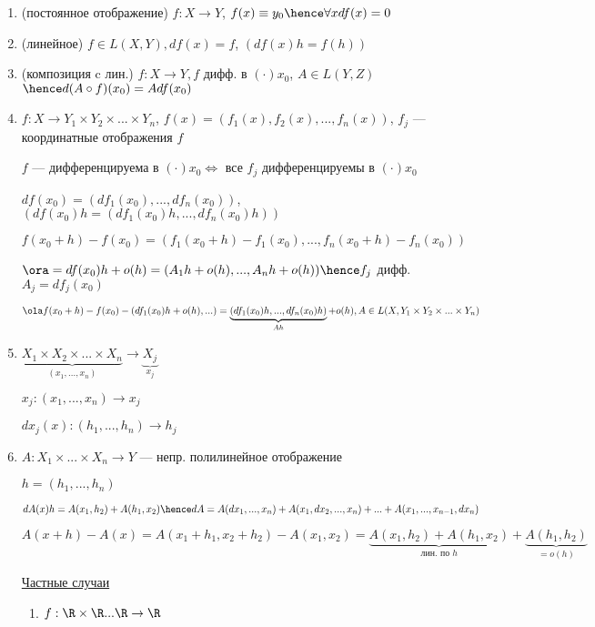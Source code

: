 \begin{examples}
\begin{enumerate}
    \item (постоянное отображение) $f: X \to Y$, $f(x) \equiv y_0 \hence \forall x df(x) = 0$
    \item (линейное) $f \in L(X, Y), df(x) = f$, $(df(x)h = f(h))$
    \item (композиция c лин.) $f : X \to Y, f$ дифф. в $(\cdot) x_0$, $A \in L(Y, Z)$ 
        $ \hence d(A \circ f)(x_0) = Adf(x_0)$
    \item $f : X \to Y_1 \times Y_2 \times ... \times Y_n$, $f(x) = (f_1(x), f_2(x), ..., f_n(x))$, $f_j$ --- координатные отображения $f$
    
    $f$ --- дифференцируема в $(\cdot) x_0 \Longleftrightarrow $ все $f_j $ дифференцируемы в $(\cdot) x_0$

    $df(x_0) = (df_1(x_0), ..., df_n(x_0))$, $\left( df(x_0)h = (df_1(x_0)h, ..., df_n(x_0)h) \right)$

    $f(x_0 + h) - f(x_0) = (f_1(x_0 + h) - f_1(x_0), ... , f_n(x_0 + h) - f_n(x_0))$

    $\ora = df(x_0)h + o(h) = (A_1h + o(h), ... , A_nh + o(h)) \hence f_j$ дифф. $A_j = df_j(x_0)$

    $\ola f(x_0 + h) - f(x_0) - (df_1(x_0)h + o(h), ... ) = \underbrace{(df_1(x_0) h, ... , df_n(x_0) h)}_{Ah} + o(h), A \in L(X, Y_1 \times Y_2 \times ... \times Y_n)$


    \item $\underbrace{X_1 \times X_2 \times ... \times X_n }_{(x_1, ... , x_n)}\to \underbrace{X_j}_{x_j}$
    
    $x_j : (x_1, ..., x_n) \to x_j$

    $dx_j(x) : (h_1, ..., h_n) \to h_j$
            
    \item $A : X_1 \times ... \times X_n \to Y$ --- непр. полилинейное отображение
    
    $h = (h_1, ..., h_n)$

    $dA(x)h = A(x_1, h_2) + A(h_1, x_2) \hence dA = A(dx_1, ..., x_n) + A(x_1, dx_2, ..., x_n) + ... + A(x_1, ..., x_{n- 1}, dx_n)$

    $A(x + h) - A(x) = A(x_1 + h_1, x_2 + h_2) - A(x_1, x_2) = \underbrace{A(x_1, h_2) + A(h_1, x_2)}_{\text{лин. по } h} + \underbrace{A(h_1, h_2)}_{=o(h)}$

    \underline{Частные случаи} 

    \begin{enumerate}
        \item $f : \R \times \R ... \R \to \R$
        

\end{enumerate}
\end{enumerate}
\end{examples}
